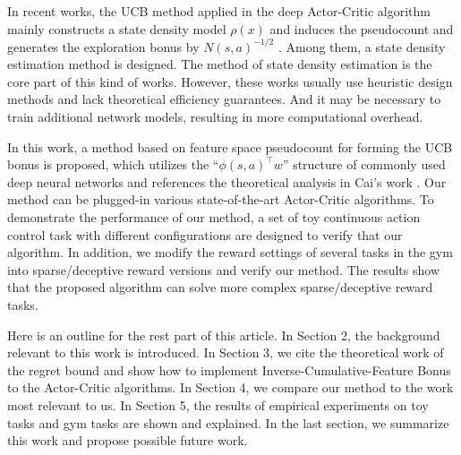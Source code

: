 In recent works, the UCB method applied in the deep Actor-Critic algorithm mainly constructs a state density model $\rho(x)$ and induces the pseudocount and generates the exploration bonus by $N(s,a)^{-1/2}$ \cite{bellemare2016unifying,ostrovski2017count,machado2018count}. Among them, a state density estimation method is designed. The method of state density estimation is the core part of this kind of works. However, these works usually use heuristic design methods and lack theoretical efficiency guarantees. And it may be necessary to train additional network models, resulting in more computational overhead.

In this work, a method based on feature space pseudocount for forming the UCB bonus is proposed, which utilizes the ``$\phi(s,a)^\top w$'' structure of commonly used deep neural networks and references the theoretical analysis in Cai's work \cite{cai2019provably}. Our method can be plugged-in various state-of-the-art Actor-Critic algorithms. To demonstrate the performance of our method, a set of toy continuous action control task with different configurations are designed to verify that our algorithm. In addition, we modify the reward settings of several tasks in the gym \cite{gym} into sparse/deceptive reward versions and verify our method. The results show that the proposed algorithm can solve more complex sparse/deceptive reward tasks.

Here is an outline for the rest part of this article. In Section 2, the background relevant to this work is introduced. In Section 3, we cite the theoretical work of the regret bound and show how to implement Inverse-Cumulative-Feature Bonus to the Actor-Critic algorithms. In Section 4, we compare our method to the work most relevant to us. In Section 5, the results of empirical experiments on toy tasks and gym tasks are shown and explained. In the last section, we summarize this work and propose possible future work.
